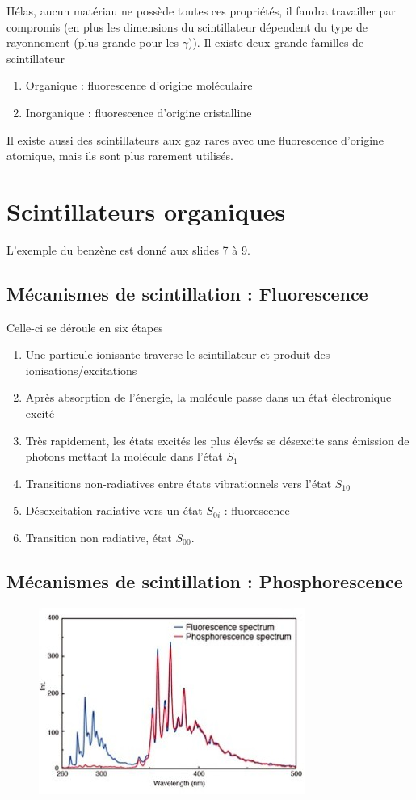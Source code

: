 Hélas, aucun matériau ne possède toutes ces propriétés, il faudra travailler par compromis (en plus
les dimensions du scintillateur dépendent du type de rayonnement (plus grande pour les $\gamma$)). Il
existe deux grande familles de scintillateur 
\begin{enumerate}
\item Organique : fluorescence d'origine moléculaire
\item Inorganique : fluorescence d'origine cristalline
\end{enumerate}
Il existe aussi des scintillateurs aux gaz rares avec une fluorescence d'origine atomique, mais ils
sont plus rarement utilisés.

\section{Scintillateurs organiques}%
L'exemple du benzène est donné aux slides 7 à 9.


\subsection{Mécanismes de scintillation : Fluorescence}%
Celle-ci se déroule en six étapes
\begin{enumerate}
\item Une particule ionisante traverse le scintillateur et produit des ionisations/excitations
\item Après absorption de l'énergie, la molécule passe dans un état électronique excité
\item Très rapidement, les états excités les plus élevés se désexcite sans émission de photons 
mettant la molécule dans l'état $S_1$
\item Transitions non-radiatives entre états vibrationnels vers l'état $S_{10}$
\item Désexcitation radiative vers un état $S_{0i}$ : fluorescence
\item Transition non radiative, état $S_{00}$.
\end{enumerate}




\subsection{Mécanismes de scintillation : Phosphorescence}%
	\begin{figure}
	\vspace{-5mm}
	\includegraphics[scale=0.55]{ch10/image1}
	\end{figure}
	

